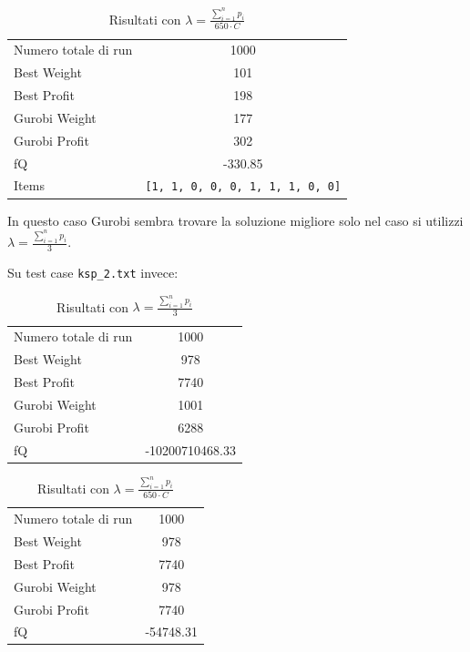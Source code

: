 \documentclass[a4paper,12pt]{article}
\begin{document}
\begin{table}[H]
\centering
\begin{tabular}{lc}
\toprule
Numero totale di run & 1000 \\
Best Weight & 101 \\
Best Profit & 198 \\
Gurobi Weight & 177 \\
Gurobi Profit & 302 \\
fQ & -330.85 \\
Items & \texttt{[1, 1, 0, 0, 0, 1, 1, 1, 0, 0]} \\
\bottomrule
\end{tabular}
\caption{Risultati con $\lambda = \displaystyle \frac{\sum_{i=1}^{n} p_i}{650 \cdot C}$}
\label{tab:tab2}
\end{table}

In questo caso Gurobi sembra trovare la soluzione migliore solo nel caso si utilizzi $\lambda = \displaystyle \frac{\sum_{i=1}^{n} p_i}{3}$.

Su test case \texttt{ksp\_2.txt} invece:

\begin{table}[H]
\centering
\begin{tabular}{lc}
\toprule
Numero totale di run & 1000 \\
Best Weight & 978 \\
Best Profit & 7740 \\
Gurobi Weight & 1001 \\
Gurobi Profit & 6288 \\
fQ & -10200710468.33 \\
\bottomrule
\end{tabular}
\caption{Risultati con $\lambda = \displaystyle \frac{\sum_{i=1}^{n} p_i}{3}$}
\label{tab:tab3}
\end{table}

\begin{table}[H]
\centering
\begin{tabular}{lc}
\toprule
Numero totale di run & 1000 \\
Best Weight & 978 \\
Best Profit & 7740 \\
Gurobi Weight & 978 \\
Gurobi Profit & 7740 \\
fQ & -54748.31 \\
\bottomrule
\end{tabular}
\caption{Risultati con $\lambda = \displaystyle \frac{\sum_{i=1}^{n} p_i}{650 \cdot C}$}
\label{tab:tab4}
\end{table}
\end{document}
